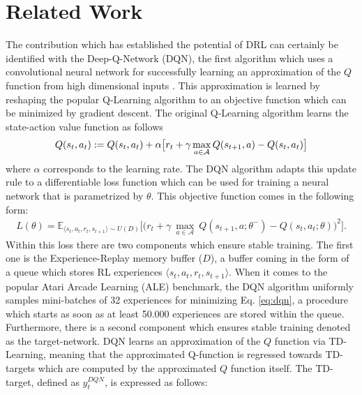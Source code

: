 \section{Related Work}
The contribution which has established the potential of DRL can certainly be identified with the Deep-Q-Network (DQN), the first algorithm which uses a convolutional neural network for successfully learning an approximation of the $Q$ function from high dimensional inputs \cite{mnih2015human}. This approximation is learned by reshaping the popular Q-Learning algorithm \cite{watkins1992q} to an objective function which can be minimized by gradient descent. The original Q-Learning algorithm learns the state-action value function as follows
\begin{multline}
Q(s_{t}, a_{t}) := Q(s_{t}, a_{t}) + \alpha \big[r_{t} + \gamma \max_{a \in \cal A} Q(s_{t+1}, a) - Q(s_{t}, a_{t})\big]
\label{eq:q_learning}
\end{multline}
where $\alpha$ corresponds to the learning rate. The DQN algorithm adapts this update rule to a differentiable loss function which can be used for training a neural network that is parametrized by $\theta$. This objective function comes in the following form: 
\begin{multline}
L(\theta) = \mathds{E}_{\langle s_{t},a_{t},r_{t},s_{t+1}\rangle\sim U(D)} \bigg[\big(r_{t} + \gamma \: \underset{a\in \mathcal{A}}{\max}\: Q(s_{t+1}, a; \theta^{-}) - Q(s_{t}, a_{t}; \theta)\big)^{2}\bigg].
\label{eq:dqn}
\end{multline}
Within this loss there are two components which ensure stable training. The first one is the Experience-Replay memory buffer ($D$), a buffer coming in the form of a queue which stores RL experiences $\langle s_{t},a_{t},r_{t},s_{t+1}\rangle$. When it comes to the popular Atari Arcade Learning (ALE) \cite{bellemare2013arcade} benchmark, the DQN algorithm uniformly samples mini-batches of 32 experiences for minimizing Eq. \ref{eq:dqn}, a procedure which starts as soon as at least 50.000 experiences are stored within the queue.
Furthermore, there is a second component which ensures stable training denoted as the target-network. DQN learns an approximation of the $Q$ function via TD-Learning, meaning that the approximated Q-function is regressed towards TD-targets which are computed by the approximated $Q$ function itself. The TD-target, defined as $y^{DQN}_{t}$, is expressed as follows:
